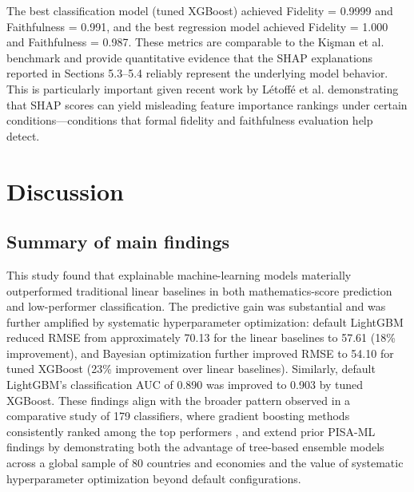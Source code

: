 \documentclass[pdflatex,sn-mathphys-ay]{sn-jnl}
\begin{document}
The best classification model (tuned XGBoost) achieved Fidelity = 0.9999 and Faithfulness = 0.991, and the best regression model achieved Fidelity = 1.000 and Faithfulness = 0.987. These metrics are comparable to the Kişman et al. benchmark and provide quantitative evidence that the SHAP explanations reported in Sections 5.3--5.4 reliably represent the underlying model behavior. This is particularly important given recent work by Létoffé et al. \citep{Letoffe_2026_rigorous_xai} demonstrating that SHAP scores can yield misleading feature importance rankings under certain conditions---conditions that formal fidelity and faithfulness evaluation help detect.

\section{Discussion}

\subsection{Summary of main findings}

This study found that explainable machine-learning models materially outperformed traditional linear baselines in both mathematics-score prediction and low-performer classification. The predictive gain was substantial and was further amplified by systematic hyperparameter optimization: default LightGBM reduced RMSE from approximately 70.13 for the linear baselines to 57.61 (18\% improvement), and Bayesian optimization further improved RMSE to 54.10 for tuned XGBoost (23\% improvement over linear baselines). Similarly, default LightGBM's classification AUC of 0.890 was improved to 0.903 by tuned XGBoost. These findings align with the broader pattern observed in a comparative study of 179 classifiers, where gradient boosting methods consistently ranked among the top performers \citep{Fernandez_Delgado_2014}, and extend prior PISA-ML findings by demonstrating both the advantage of tree-based ensemble models across a global sample of 80 countries and economies and the value of systematic hyperparameter optimization beyond default configurations.
\end{document}
